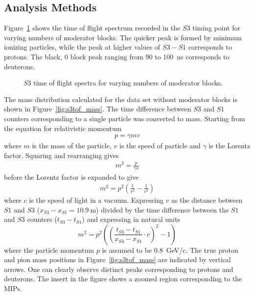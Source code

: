 \subsection{Analysis Methods}

Figure~\ref{fig:s3tof} shows the time of flight spectrum recorded in the $\mathit{S3}$ timing point for varying numbers of moderator blocks.
The quicker peak is formed by minimum ionizing particles, while the peak at higher values of $\mathit{S3} - \mathit{S1}$ corresponds to protons.
The black, 0 block peak ranging from 90 to 100~ns corresponds to deuterons.
\begin{figure}[h]
  \begin{adjustbox}{max totalsize={.8\textwidth}{.5\textheight},center}
    
  \end{adjustbox}
  \caption{$\mathit{S3}$ time of flight spectra for varying numbers of moderator blocks.}
  \label{fig:s3tof}
\end{figure}

The mass distribution calculated for the data set without moderator blocks is shown in Figure~\ref{fig:s3tof_mass}.
The time difference between $\mathit{S3}$ and $\mathit{S1}$ counters corresponding to a single particle was converted to mass.
Starting from the equation for relativistic momentum
\begin{align}
p = \gamma m v
\end{align}
where $m$ is the mass of the particle, $v$ is the speed of particle and $\gamma$ is the Lorentz factor.
Squaring and rearranging gives
\begin{align}
m^{2} = \frac{p}{\gamma v}
\end{align}
before the Lorentz factor is expanded to give
\begin{align}
m^{2} = p^{2}\left(\frac{1}{v^{2}} - \frac{1}{c^{2}}\right)
\end{align}
where $c$ is the speed of light in a vacuum. Expressing $v$ as the distance between $\mathit{S1}$ and $\mathit{S3}$ ($x_{\mathit{S3}}-x_{\mathit{S1}} = 10.9~\text{m}$) divided by the time difference between the $\mathit{S1}$ and $\mathit{S3}$ counters ($t_{\mathit{S3}} - t_{\mathit{S1}}$) and expressing in natural units 
\begin{equation} 
m^2 = p^2 \left( 
\left(\frac{t_{\mathit{S3}}-t_{\mathit{S1}}}{x_{\mathit{S3}}-x_{\mathit{S1}}} \cdot c \right)^2
- 1  \right)
\label{eq:recoMass}
\end{equation}
where the particle momentum $p$ is assumed to be 0.8~GeV/c.
The true proton and pion mass positions in Figure~\ref{fig:s3tof_mass} are indicated by vertical arrows.
One can clearly observe distinct peaks corresponding to protons and deuterons. 
The insert in the figure shows a zoomed region corresponding to the MIPs. 

